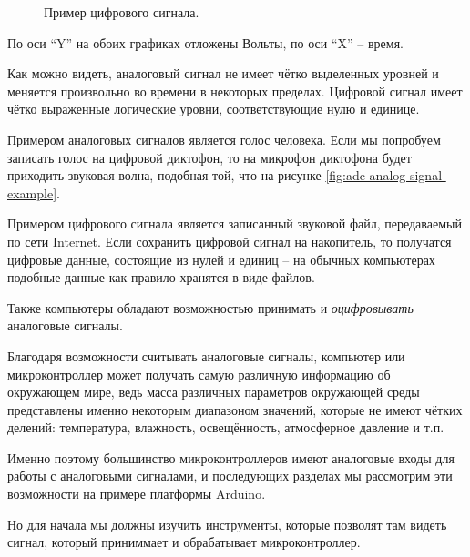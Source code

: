 \documentclass[a4paper,twoside]{book}
\newcounter{example-counter}
\begin{document}
\begin{figure}[ht]
  \caption{Пример цифрового сигнала.}
  \label{fig:adc-digital-signal-example}
\end{figure}

По оси ``Y'' на обоих графиках отложены Вольты, по оси ``X'' -- время.

Как можно видеть, аналоговый сигнал не имеет чётко выделенных уровней и меняется
произвольно во времени в некоторых пределах.  Цифровой сигнал имеет чётко
выраженные логические уровни, соответствующие нулю и единице.

Примером аналоговых сигналов является голос человека.  Если мы попробуем
записать голос на цифровой диктофон, то на микрофон диктофона будет приходить
звуковая волна, подобная той, что на рисунке
\ref{fig:adc-analog-signal-example}.

Примером цифрового сигнала является записанный звуковой файл, передаваемый по
сети Internet.  Если сохранить цифровой сигнал на накопитель, то получатся
цифровые данные, состоящие из нулей и единиц -- на обычных компьютерах подобные
данные как правило хранятся в виде файлов.

Также компьютеры обладают возможностью принимать и \emph{оцифровывать}
аналоговые сигналы.

Благодаря возможности считывать аналоговые сигналы, компьютер или
микроконтроллер может получать самую различную информацию об окружающем мире,
ведь масса различных параметров окружающей среды представлены именно некоторым
диапазоном значений, которые не имеют чётких делений: температура, влажность,
освещённость, атмосферное давление и т.п.

Именно поэтому большинство микроконтроллеров имеют аналоговые входы для работы с
аналоговыми сигналами, и последующих разделах мы рассмотрим эти возможности на
примере платформы Arduino.

Но для начала мы должны изучить инструменты, которые позволят там видеть сигнал,
который приниммает и обрабатывает микроконтроллер.
\end{document}
